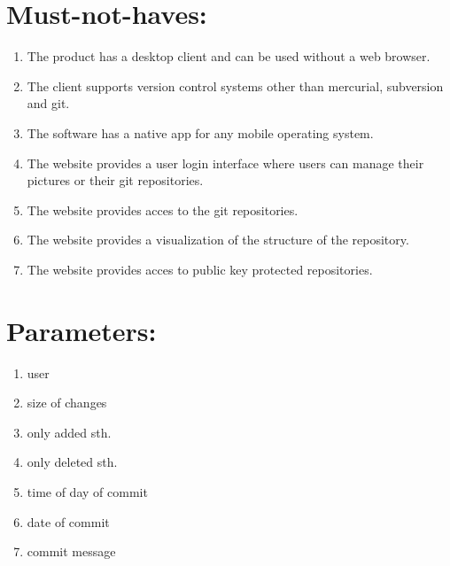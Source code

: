 \documentclass[10pt]{scrartcl}
\begin{document}
\section{Must-not-haves:}
\begin{enumerate}
\item The product has a desktop client and can be used without a web browser.
\item The client supports version control systems other than mercurial, subversion and git.
\item The software has a native app for any mobile operating system.
\item The website provides a user login interface where users can manage their pictures or their git repositories.
\item The website provides acces to the git repositories.
\item The website provides a visualization of the structure of the repository.
\item The website provides acces to public key protected repositories.
\end{enumerate}
\section{Parameters:}
\begin{enumerate}
\item user
\item size of changes
\item only added sth.
\item only deleted sth.
\item time of day of commit
\item date of commit
\item commit message
\end{enumerate}
\end{document}
